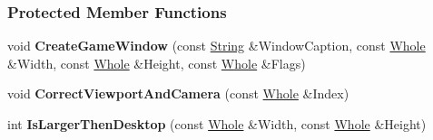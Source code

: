 \subsubsection*{Protected Member Functions}
\begin{DoxyCompactItemize}
\item 
\hypertarget{classphys_1_1GameWindow_adc0759b53d44ac8a81018a9f961a97c9}{
void {\bfseries CreateGameWindow} (const \hyperlink{namespacephys_aa03900411993de7fbfec4789bc1d392e}{String} \&WindowCaption, const \hyperlink{namespacephys_a460f6bc24c8dd347b05e0366ae34f34a}{Whole} \&Width, const \hyperlink{namespacephys_a460f6bc24c8dd347b05e0366ae34f34a}{Whole} \&Height, const \hyperlink{namespacephys_a460f6bc24c8dd347b05e0366ae34f34a}{Whole} \&Flags)}
\label{classphys_1_1GameWindow_adc0759b53d44ac8a81018a9f961a97c9}

\item 
\hypertarget{classphys_1_1GameWindow_a899c591968cc67db902eb3490b44bfec}{
void {\bfseries CorrectViewportAndCamera} (const \hyperlink{namespacephys_a460f6bc24c8dd347b05e0366ae34f34a}{Whole} \&Index)}
\label{classphys_1_1GameWindow_a899c591968cc67db902eb3490b44bfec}

\item 
\hypertarget{classphys_1_1GameWindow_a94674f9c968898df68fb58f30f91542e}{
int {\bfseries IsLargerThenDesktop} (const \hyperlink{namespacephys_a460f6bc24c8dd347b05e0366ae34f34a}{Whole} \&Width, const \hyperlink{namespacephys_a460f6bc24c8dd347b05e0366ae34f34a}{Whole} \&Height)}
\label{classphys_1_1GameWindow_a94674f9c968898df68fb58f30f91542e}

\end{DoxyCompactItemize}
